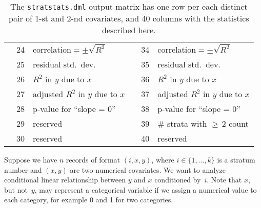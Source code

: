 \begin{table}[t]
\begin{tabular}{|rcl|rcl|}
& 24     & correlation${} = \pm\sqrt{R^2}$  &
& 34     & correlation${} = \pm\sqrt{R^2}$  \\
& 25     & residual std.\ dev.              &
& 35     & residual std.\ dev.              \\
& 26     & $R^2$ in $y$ due to $x$          &
& 36     & $R^2$ in $y$ due to $x$          \\
& 27     & adjusted $R^2$ in $y$ due to $x$ &
& 37     & adjusted $R^2$ in $y$ due to $x$ \\
& 28     & p-value for ``slope = 0''        &
& 38     & p-value for ``slope = 0''        \\
& 29     & reserved                         &
& 39     & \# strata with ${\geq}\,2$ count \\
& 30     & reserved                         &
& 40     & reserved                         \\
\hline
\end{tabular}\hfil
\caption{The {\tt stratstats.dml} output matrix has one row per each distinct
pair of 1-st and 2-nd covariates, and 40 columns with the statistics described
here.}
\label{table:stratoutput}
\end{table}




\smallskip

Suppose we have $n$ records of format $(i, x, y)$, where $i\in\{1,\ldots, k\}$ is
a stratum number and $(x, y)$ are two numerical covariates.  We want to analyze
conditional linear relationship between $y$ and $x$ conditioned by~$i$.
Note that $x$, but not~$y$, may represent a categorical variable if we assign a
numerical value to each category, for example 0 and 1 for two categories.

